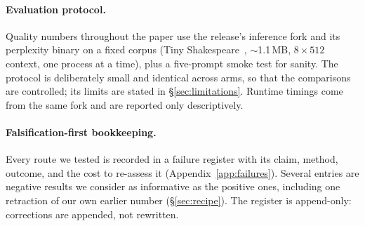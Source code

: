\paragraph{Evaluation protocol.}
Quality numbers throughout the paper use the release's inference fork and its
perplexity binary on a fixed corpus (Tiny Shakespeare~\citep{tinyshakespeare},
$\sim$1.1\,MB, $8\times512$ context, one process at a time), plus a five-prompt
smoke test for sanity. The protocol is deliberately small and identical across arms, so that
the comparisons are controlled; its limits are stated in
\S\ref{sec:limitations}. Runtime timings come from the same fork and are
reported only descriptively.

\paragraph{Falsification-first bookkeeping.}
Every route we tested is recorded in a failure register with its claim, method,
outcome, and the cost to re-assess it (Appendix~\ref{app:failures}). Several
entries are negative results we consider as informative as the positive ones,
including one retraction of our own earlier number
(\S\ref{sec:recipe}). The register is append-only: corrections are appended,
not rewritten.
